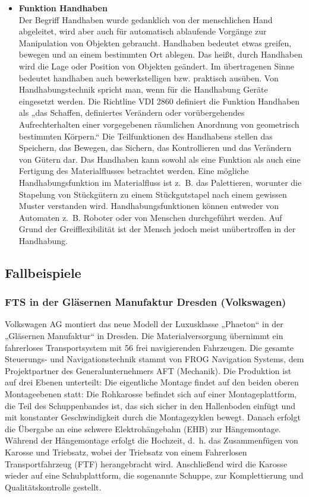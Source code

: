 \begin{itemize}
\item \textbf{Funktion Handhaben } \\
Der Begriff Handhaben wurde gedanklich von der menschlichen Hand abgeleitet, wird aber auch f\"ur automatisch ablaufende Vorg\"ange zur Manipulation von Objekten gebraucht.
Handhaben bedeutet etwas greifen, bewegen und an einem bestimmten Ort ablegen.
Das hei\ss t, durch Handhaben wird die Lage oder Position von Objekten ge\"andert.
Im \"ubertragenen Sinne bedeutet handhaben auch bewerkstelligen bzw. praktisch aus\"uben.
Von Handhabungstechnik spricht man, wenn f\"ur die Handhabung Ger\"ate eingesetzt werden.
Die Richtline VDI 2860 definiert die Funktion Handhaben als „das Schaffen, definiertes Ver\"andern oder vor\"ubergehendes Aufrechterhalten einer vorgegebenen r\"aumlichen Anordnung von geometrisch bestimmten K\"orpern.“
Die Teilfunktionen des Handhabens stellen das Speichern, das Bewegen, das Sichern, das Kontrollieren und das Ver\"andern von G\"utern dar.
Das Handhaben kann sowohl als eine Funktion als auch eine Fertigung des Materialflusses betrachtet werden.
Eine m\"ogliche Handhabungsfunktion im Materialfluss ist z.~B. das Palettieren, worunter die Stapelung von St\"uckg\"utern zu einem St\"uckgutstapel nach einem gewissen Muster verstanden wird.
Handhabungsfunktionen k\"onnen entweder von Automaten z.~B. Roboter oder von Menschen durchgef\"uhrt werden.
Auf Grund der Greifflexibilit\"at ist der Mensch jedoch meist un\"ubertroffen in der Handhabung.
\end{itemize}

\subsection{Fallbeispiele}
\subsubsection{FTS in der Gl\"asernen Manufaktur Dresden (Volkswagen)}
Volkswagen AG montiert das neue Modell der Luxusklasse „Phaeton“ in der „Gl\"asernen Manufaktur“ in Dresden.
Die Materialversorgung \"ubernimmt ein fahrerloses Transportsystem mit 56 frei navigierenden Fahrzeugen.
Die gesamte Steuerungs- und Navigationstechnik stammt von FROG Navigation Systems, dem Projektpartner des Generalunternehmers AFT (Mechanik).
Die Produktion ist auf drei Ebenen unterteilt:
Die eigentliche Montage findet auf den beiden oberen Montageebenen statt:
Die Rohkarosse befindet sich auf einer Montageplattform, die Teil des Schuppenbandes ist, das sich sicher in den Hallenboden einf\"ugt und mit konstanter Geschwindigkeit durch die Montagezyklen bewegt.
Danach erfolgt die \"Ubergabe an eine schwere Elektroh\"angebahn (EHB) zur H\"angemontage.
W\"ahrend der H\"angemontage erfolgt die Hochzeit, d.~h. das Zusammenf\"ugen von Karosse und Triebsatz, wobei der Triebsatz von einem Fahrerlosen Transportfahrzeug (FTF) herangebracht wird.
Anschlie\ss end wird die Karosse wieder auf eine Schubplattform, die sogenannte Schuppe, zur Komplettierung und Qualit\"atskontrolle gestellt.

